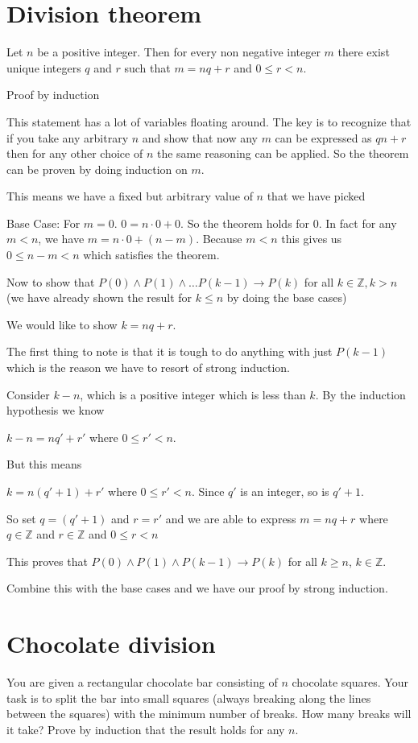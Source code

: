 \documentclass[12pt]{article}
\begin{document}
\section*{Division theorem}
Let $n$ be a positive integer. Then for every non negative integer $m$ there exist unique integers $q$ and $r$ such that $m = nq + r$ and $0 \le r <n$.

Proof by induction

This statement has a lot of variables floating around. The key is to recognize that if you take any arbitrary $n$ and show that now any $m$ can be expressed as $qn +r$ then for any other choice of $n$ the same reasoning can be applied. So the theorem can be proven by doing induction on $m$.

This means we have a fixed but arbitrary value of $n$ that we have picked

Base Case: For $m =0$.  $0 = n \cdot 0 + 0 $. So the theorem holds for 0. In fact for any $m < n$, we have $m = n \cdot 0 + (n - m)$. Because $m < n$ this gives us $ 0 \le n-m < n$ which satisfies the theorem. 

Now to show that $P(0) \wedge P(1) \wedge \ldots P(k-1) \rightarrow P(k)$  for all $ k \in \mathbb{Z}, k > n$ (we have already shown the result for $k \le n$ by doing the base cases)

We would like to show $k = nq + r$. 

The first thing to note is that it is tough to do anything with just $P(k-1)$ which is the reason we have to resort of strong induction. 

Consider $k - n$, which is a positive integer which is less than $k$. By the induction hypothesis we know

$k - n = nq' + r'$ where $0 \le r '< n$.

But this means

$k = n(q' + 1) + r'$ where $0 \le r' < n$. Since $q'$ is an integer, so is $q' + 1$.

So set $q = (q' +1)$ and $r = r'$ and we are able to express $m = nq + r$ where $q \in \mathbb{Z}$ and $r \in \mathbb{Z}$ and  $0 \le r < n$

This proves that $P(0) \wedge P(1) \wedge P(k - 1) \rightarrow P(k)$ for all $k \ge n$, $k \in \mathbb{Z}$.

Combine this with the base cases and we have our proof by strong induction.
 
\section*{Chocolate division}
You are given a rectangular chocolate bar consisting of $n$ chocolate squares. Your task is to split the bar into small squares (always breaking along the lines between the squares) with the minimum number of breaks. How many breaks will it take? Prove by induction that the result holds for any $n$.
\end{document}
